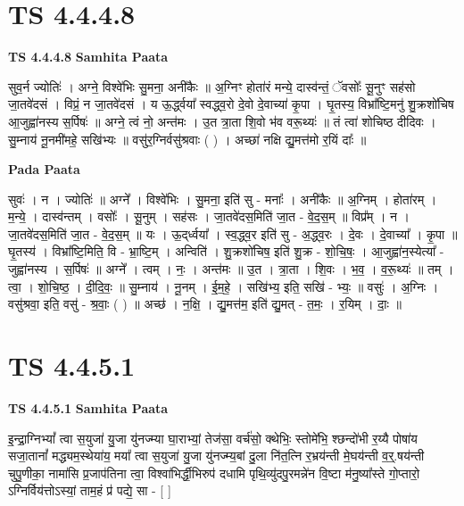 \documentclass[17pt]{extarticle}
\begin{document}
\section*{ TS 4.4.4.8 }

\textbf{TS 4.4.4.8 } \newline
\textbf{Samhita Paata} \newline

सुव॒र्न ज्योतिः॑ । अग्ने॒ विश्वे॑भिः सु॒मना॒ अनी॑कैः ॥ अ॒ग्निꣳ होता॑रं मन्ये॒ दास्व॑न्तं॒ ॅवसोः᳚ सू॒नुꣳ सह॑सो जा॒तवे॑दसं । विप्रं॒ न जा॒तवे॑दसं । य ऊ॒र्द्ध्वया᳚ स्वद्ध्व॒रो दे॒वो दे॒वाच्या॑ कृ॒पा । घृ॒तस्य॒ विभ्रा᳚ष्टि॒मनु॑ शु॒क्रशो॑चिष आ॒जुह्वा॑नस्य स॒र्पिषः॑ ॥ अग्ने॒ त्वं नो॒ अन्त॑मः । उ॒त त्रा॒ता शि॒वो भ॑व वरू॒थ्यः॑ ॥ तं त्वा॑ शोचिष्ठ दीदिवः । सु॒म्नाय॑ नू॒नमी॑महे॒ सखि॑भ्यः ॥ वसु॑र॒ग्निर्वसु॑श्रवाः ( ) । अच्छा॑ नक्षि द्यु॒मत्त॑मो र॒यिं दाः᳚ ॥ \newline

\textbf{Pada Paata} \newline

सुवः॑ । न । ज्योतिः॑ ॥ अग्ने᳚ । विश्वे॑भिः । सु॒मना॒ इति॑ सु - मनाः᳚ । अनी॑कैः ॥ अ॒ग्निम् । होता॑रम् । म॒न्ये॒ । दास्व॑न्तम् । वसोः᳚ । सू॒नुम् । सह॑सः । जा॒तवे॑दस॒मिति॑ जा॒त - वे॒द॒स॒म् ॥ विप्र᳚म् । न । जा॒तवे॑दस॒मिति॑ जा॒त - वे॒द॒स॒म् ॥ यः । ऊ॒द्‌र्ध्वया᳚ । स्व॒द्ध्व॒र इति॑ सु - अ॒द्ध्व॒रः । दे॒वः । दे॒वाच्या᳚ । कृ॒पा ॥ घृ॒तस्य॑ । विभ्रा᳚ष्टि॒मिति॒ वि - भ्रा॒ष्टि॒म् । अन्विति॑ । शु॒क्रशो॑चिष॒ इति॑ शु॒क्र - शो॒चि॒षः॒ । आ॒जुह्वा॑न॒स्येत्या᳚ - जुह्वा॑नस्य । स॒र्पिषः॑ ॥ अग्ने᳚ । त्वम् । नः॒ । अन्त॑मः ॥ उ॒त । त्रा॒ता । शि॒वः । भ॒व॒ । व॒रू॒थ्यः॑ ॥ तम् । त्वा॒ । शो॒चि॒ष्ठ॒ । दी॒दि॒वः॒ ॥ सु॒म्नाय॑ । नू॒नम् । ई॒म॒हे॒ । सखि॑भ्य॒ इति॒ सखि॑ - भ्यः॒ ॥ वसुः॑ । अ॒ग्निः । वसु॑श्रवा॒ इति॒ वसु॑ - श्र॒वाः॒ ( ) ॥ अच्छ॑ । न॒क्षि॒ । द्यु॒मत्त॑म॒ इति॑ द्यु॒मत् - त॒मः॒ । र॒यिम् । दाः॒ ॥  \newline




\section*{ TS 4.4.5.1 }

\textbf{TS 4.4.5.1 } \newline
\textbf{Samhita Paata} \newline

इ॒न्द्रा॒ग्निभ्यां᳚ त्वा स॒युजा॑ यु॒जा यु॑नज्म्या घा॒राभ्यां॒ तेज॑सा॒ वर्च॑सो॒ क्थेभिः॒ स्तोमे॑भि॒ श्छन्दो॑भी र॒य्यै पोषा॑य सजा॒तानां᳚ मद्ध्यम॒स्थेया॑य॒ मया᳚ त्वा स॒युजा॑ यु॒जा यु॑नज्म्य॒बां दु॒ला नि॑त॒त्नि र॒भ्रय॑न्ती मे॒घय॑न्ती व॒र्॒.षय॑न्ती चुपु॒णीका॒ नामा॑सि प्र॒जाप॑तिना त्वा॒ विश्वा॑भिर्द्धी॒भिरुप॑ दधामि पृथि॒व्यु॑दपु॒रमन्ने॑न वि॒ष्टा म॑नु॒ष्या᳚स्ते गो॒प्तारो॒ ऽग्निर्विय॑त्तोऽस्यां॒ ताम॒हं प्र॑ पद्ये॒ सा - [  ] \newline
\end{document}
